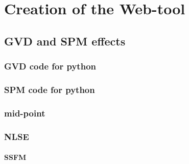 \chapter{Creation of the Web-tool}

\section{GVD and SPM effects}
    \subsection{GVD code for python}
    \subsection{SPM code for python}
        \subsection{mid-point}
    \subsection{NLSE}
        \subsubsection{SSFM}